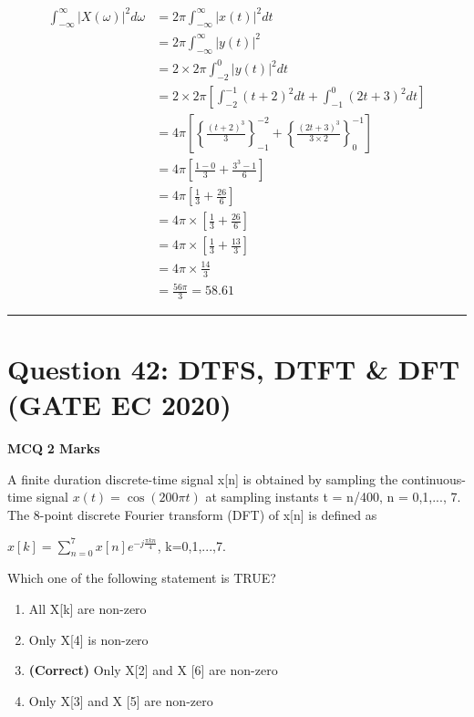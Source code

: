 \documentclass[11pt,a4paper]{article}
\begin{document}
\begin{tcolorbox}[solbox, title=Detailed Solution -- Question 41]
\[
\begin{aligned} \int_{-\infty }^{\infty }\left | X(\omega ) \right |^{2}d\omega &=2\pi \int_{-\infty }^{\infty }\left | x(t) \right |^{2}dt \\ &=2\pi \int_{-\infty }^{\infty }\left | y(t) \right |^{2}\\      &=2\times 2\pi \int_{-2}^{0}\left | y(t) \right |^{2}dt\\      &=2\times 2\pi\left [ \int_{-2}^{-1}(t+2)^{2}dt+\int_{-1}^{0}(2t+3)^{2}dt \right ]\\&=4\pi \left [\left \{ \frac{(t+2)^{3}}{3} \right \} _{-1}^{-2}+\left \{ \frac{(2t+3)^3}{3\times 2} \right \}_{0}^{-1} \right ]\\&=4\pi \left [ \frac{1-0}{3}+\frac{3^{3}-1}{6} \right ]\\&=4\pi \left [ \frac{1}{3}+\frac{26}{6} \right ]\\&=     4\pi \times \left [ \frac{1}{3}+\frac{26}{6} \right ] \\ &=4\pi \times \left [ \frac{1}{3}+\frac{13}{3} \right ]\\&=4\pi \times \frac{14}{3} \\&=\frac{56\pi }{3}=58.61\end{aligned}
\]
\end{tcolorbox}

\vspace{1.5em}
\hrule
\vspace{1.5em}

\section*{Question 42: DTFS, DTFT \& DFT (GATE EC 2020)}
\noindent \textbf{\color{primary}MCQ} \hfill \textbf{\color{secondary}2 Marks}


\noindent A finite duration discrete-time signal x[n] is obtained by sampling the continuous-time
signal $x(t) = \cos (200 \pi t)$ at sampling instants t = n/400, n = 0,1,..., 7. The 8-point
discrete Fourier transform (DFT) of x[n] is defined as 

$x[k]=\sum_{n=0}^{7}x[n]e^{-j\frac{\pi kn}{4}}$,  k=0,1,...,7.

 Which one of the following statement is TRUE?


\begin{enumerate}[label=(\Alph*)]
    \item All X[k] are non-zero
    \item Only X[4] is non-zero
    \item \textbf{(Correct)} Only X[2] and X [6] are non-zero
    \item Only X[3] and X [5] are non-zero
\end{enumerate}
\end{document}
